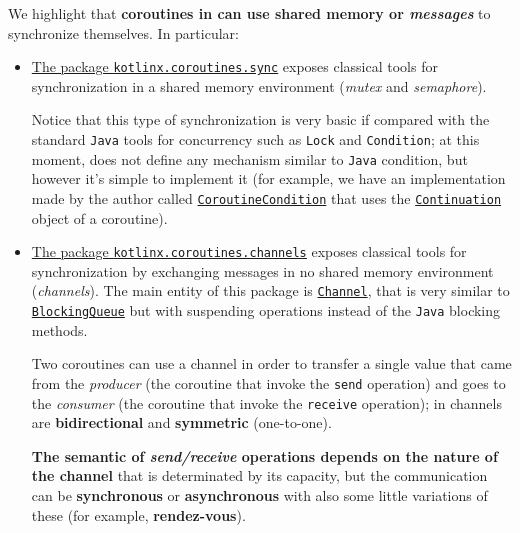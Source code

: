 We highlight that \textbf{coroutines in \Kotlin can use shared memory or \textit{messages}} to synchronize themselves. In particular:
\begin{itemize}
	\item \underline{The package \href{https://kotlinlang.org/api/kotlinx.coroutines/kotlinx-coroutines-core/kotlinx.coroutines.sync/}{\texttt{kotlinx.coroutines.sync}}} exposes classical tools for synchronization in a shared memory environment (\textit{mutex} and \textit{semaphore}).
	
	Notice that this type of synchronization is very basic if compared with the standard \texttt{Java} tools for concurrency such as \texttt{Lock} and \texttt{Condition}; at this moment, \Kotlin does not define any mechanism similar to \texttt{Java} condition, but however it's simple to implement it (for example, we have an implementation made by the author called \href{https://github.com/LM-96/KBomber/blob/main/kbomberx-concurrency/src/main/kotlin/kbomberx/concurrency/sync/CoroutineCondition.kt}{\texttt{CoroutineCondition}} that uses the \href{https://kotlinlang.org/api/latest/jvm/stdlib/kotlin.coroutines/-continuation/}{\texttt{Continuation}} object of a coroutine).
	
	\item \underline{The package \href{https://kotlinlang.org/api/kotlinx.coroutines/kotlinx-coroutines-core/kotlinx.coroutines.channels/}{\texttt{kotlinx.coroutines.channels}}} exposes classical tools for synchronization by exchanging messages in no shared memory environment (\textit{channels}).
	The main entity of this package is \href{https://kotlinlang.org/docs/channels.html}{\texttt{Channel}}, that is very similar to \href{https://docs.oracle.com/en/java/javase/18/docs/api/java.base/java/util/concurrent/BlockingQueue.html}{\texttt{BlockingQueue}} but with suspending operations instead of the \texttt{Java} blocking methods.
	
	Two coroutines can use a channel in order to transfer a single value that came from the \textit{producer} (the coroutine that invoke the \texttt{send} operation) and goes to the \textit{consumer} (the coroutine that invoke the \texttt{receive} operation); in \Kotlin channels are \textbf{bidirectional} and \textbf{symmetric} (one-to-one).
	
	\textbf{The semantic of \textit{send/receive} operations depends on the nature of the channel} that is determinated by its capacity, but the communication can be \textbf{synchronous} or \textbf{asynchronous} with also some little variations of these (for example, \textbf{rendez-vous}).
	

\end{itemize}
